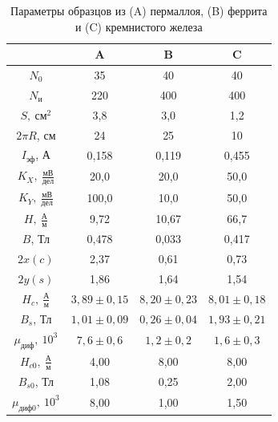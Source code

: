 \documentclass[a4paper,10pt]{article}
\begin{document}
\begin{table}[h]
	\centering
	\caption{Параметры образцов из (A) пермаллоя, (B) феррита и (C) кремнистого железа} \label{Table_1}
	\begin{tabular}{|c|c|c|c|}
		\hline
		 & A & B & C \\ \hline
		$N_0$ & 35 & 40 & 40  \\ \hline
		$N_{\text{и}}$ & 220 & 400 & 400 \\ \hline
		$S,\ \text{см}^2$ & 3,8 & 3,0 & 1,2 \\ \hline
		$2\pi R$, см & 24 & 25 & 10 \\ \hline
		$I_{\text{эф}}$, А & 0,158 & 0,119 & 0,455 \\ \hline
		$K_X,\ \frac{\text{мВ}}{\text{дел}}$ & 20,0 & 20,0 & 50,0 \\ \hline
		$K_Y,\ \frac{\text{мВ}}{\text{дел}}$ & 100,0 & 10,0 & 50,0 \\ \hline
		$H,\ \frac{\text{А}}{\text{м}}$ & 9,72 & 10,67 & 66,7 \\ \hline
		$B$, Тл & 0,478 & 0,033 & 0,417 \\ \hline
		$2x\left(c\right)$ & 2,37 & 0,61 & 0,73 \\ \hline
		$2y\left(s\right)$ & 1,86 & 1,64 & 1,54 \\ \hline
		$H_c,\ \frac{\text{А}}{\text{м}}$ & $3,89\pm0,15$ & $8,20\pm0,23$ & $8,01\pm0,18$ \\ \hline
		$B_s$, Тл & $1,01\pm0,09$ & $0,26\pm0,04$ & $1,93\pm0,21$ \\ \hline
		$\mu_{\text{диф}},\ 10^3$ & $7,6\pm0,6$ & $1,2\pm0,2$ & $1,6\pm0,3$ \\ \hline
		$H_{c0},\ \frac{\text{А}}{\text{м}}$ & 4,00 & 8,00 & 8,00 \\ \hline
		$B_{s0}$, Тл & 1,08 & 0,25 & 2,00 \\ \hline
		$\mu_{\text{диф}0},\ 10^3$ & 8,00 & 1,00 & 1,50 \\ \hline
	\end{tabular}
\end{table}
\end{document}
